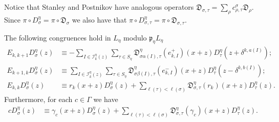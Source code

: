 \documentclass[11pt,fleqn]{article}
\newcommand\DD{\mathfrak D}
\newcommand\I{\mathcal I}
\newcommand\p{\mathfrak p}
\begin{document}
Notice that Stanley and Postnikov have analogous operators $\DD_{\sigma,\tau}
= \sum_{\rho} c_{\rho, \tau}^\sigma \DD_\rho$. Since $\pi \circ D_\sigma^\eta 
= \pi \circ \DD_\sigma$ we also have that $\pi \circ D_{\sigma,\tau}^\eta 
= \pi \circ \DD_{\sigma, \tau}$.

\begin{Proposition}
\label{P:module-congruence}
The following congruences hold in $L_\eta$ modulo $\p_\eta L_\eta$
\begin{align*}
E_{k,k+1} D_\sigma^\eta(z)
	&\equiv - \sum_{I \in \I_k^\eta(z)}
	\sum_{\tau \in S_\eta}
	\DD^\eta_{\sigma\alpha(I),\tau}
		\left(
			e_{k,I}^+
		\right)(x+z) D_\tau^\eta(z+\delta^{k,a(I)}); \\
E_{k+1,k} D_\sigma^\eta(z)
	&\equiv \sum_{I \in \I_k^\eta(z)} 
		\sum_{\tau \in S_\eta} 
		\DD_{\sigma\beta(I),\tau}^\eta \left(e_{k,I}^- \right)
		(x+z) D_\tau^\eta(z - \delta^{k,b(I)});\\
E_{k,k} D_\sigma^\eta(z)
	&\equiv r_k(x+z) D_\sigma^\eta(z) +
		\sum_{\ell(\tau) < \ell(\sigma)} 
		\DD_{\sigma, \tau}^\eta(r_k)(x+z) 
			D_\tau^\eta(z).
\end{align*}
Furthermore, for each $c \in \Gamma$ we have
\begin{align*}
c D_\sigma^\eta(z)
	&\equiv \gamma_c(x+z) D_\sigma^\eta(z) +
		\sum_{\ell(\tau) < \ell(\sigma)} 
			\DD_{\sigma, \tau}^\eta(\gamma_c)(x+z) 
			D_\tau^\eta(z).
\end{align*}
\end{Proposition}
\end{document}
